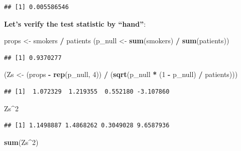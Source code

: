 \documentclass[
]{book}
\newenvironment{Shaded}{\begin{snugshade}}{\end{snugshade}}
\newcommand{\DecValTok}[1]{\textcolor[rgb]{0.00,0.00,0.81}{#1}}
\newcommand{\FunctionTok}[1]{\textcolor[rgb]{0.13,0.29,0.53}{\textbf{#1}}}
\newcommand{\NormalTok}[1]{#1}
\newcommand{\OtherTok}[1]{\textcolor[rgb]{0.56,0.35,0.01}{#1}}
\newcommand{\SpecialCharTok}[1]{\textcolor[rgb]{0.81,0.36,0.00}{\textbf{#1}}}
\begin{document}
\begin{verbatim}
## [1] 0.005586546
\end{verbatim}

\textbf{Let's verify the test statistic by ``hand''}:

\begin{Shaded}
\begin{Highlighting}[]
\NormalTok{props }\OtherTok{\textless{}{-}}\NormalTok{ smokers }\SpecialCharTok{/}\NormalTok{ patients}
\NormalTok{(p\_null }\OtherTok{\textless{}{-}} \FunctionTok{sum}\NormalTok{(smokers) }\SpecialCharTok{/} \FunctionTok{sum}\NormalTok{(patients))}
\end{Highlighting}
\end{Shaded}

\begin{verbatim}
## [1] 0.9370277
\end{verbatim}

\begin{Shaded}
\begin{Highlighting}[]
\NormalTok{(Zs }\OtherTok{\textless{}{-}}\NormalTok{ (props }\SpecialCharTok{{-}} \FunctionTok{rep}\NormalTok{(p\_null, }\DecValTok{4}\NormalTok{)) }\SpecialCharTok{/}\NormalTok{ (}\FunctionTok{sqrt}\NormalTok{(p\_null }\SpecialCharTok{*}\NormalTok{ (}\DecValTok{1} \SpecialCharTok{{-}}\NormalTok{ p\_null) }\SpecialCharTok{/}\NormalTok{ patients)))}
\end{Highlighting}
\end{Shaded}

\begin{verbatim}
## [1]  1.072329  1.219355  0.552180 -3.107860
\end{verbatim}

\begin{Shaded}
\begin{Highlighting}[]
\NormalTok{Zs}\SpecialCharTok{\^{}}\DecValTok{2}
\end{Highlighting}
\end{Shaded}

\begin{verbatim}
## [1] 1.1498887 1.4868262 0.3049028 9.6587936
\end{verbatim}

\begin{Shaded}
\begin{Highlighting}[]
\FunctionTok{sum}\NormalTok{(Zs}\SpecialCharTok{\^{}}\DecValTok{2}\NormalTok{)}
\end{Highlighting}
\end{Shaded}
\end{document}
